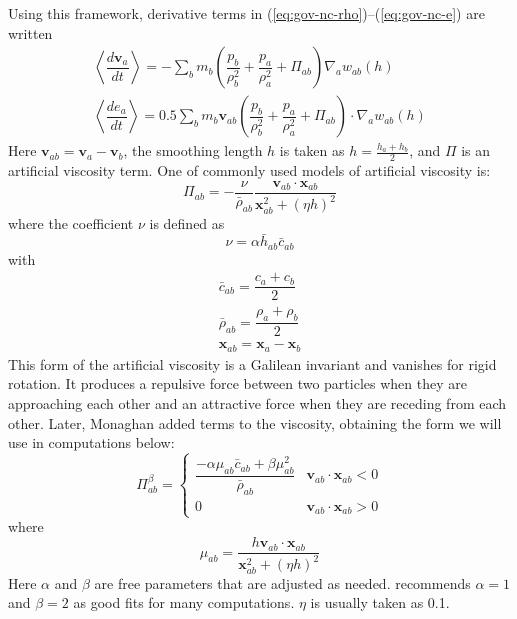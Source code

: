 \documentclass[review]{elsarticle}
\begin{document}
 Using this framework, derivative terms in (\ref{eq:gov-nc-rho})--(\ref{eq:gov-nc-e}) are written 
\begin{align}
\left\langle\dfrac{d \textbf{v}_a}{d t}\right\rangle = -\sum_b m_b \left(\dfrac{p_b}{\rho_b^2} + \dfrac{p_a}{\rho_a^2} + \Pi_{ab}\right) \nabla_a w_{a b}\left(h\right) \label{eq:ns-sph-v} \\
\left\langle\dfrac{d e_a}{d t}\right\rangle=
 0.5\sum_b m_b \textbf{v}_{a b}\left(\dfrac{p_b}{\rho_b^2} + \dfrac{p_a}{\rho_a^2} + \Pi_{ab}\right) \cdot \nabla_a w_{a b}\left(h\right) \label{eq:ns-sph-e}
\end{align}
Here $\textbf{v}_{a b} = \textbf{v}_a - \textbf{v}_b$, the smoothing length $h$ 
is taken as $h=\frac{h_a + h_b}{2}$, and $\Pi$ is an artificial viscosity term.
One of commonly used models of artificial viscosity \citep{monaghan1983shock} is:
\begin{equation}
\Pi_{ab}=- \frac{\nu}{\bar{\rho}_{ab}} \dfrac{ \textbf{v}_{ab} \cdot \textbf{x}_{ab}}{\textbf{x}_{ab}^2 + \left(\eta h\right)^2}
\label{eq:art-vis-original}
\end{equation}
where the coefficient $\nu$ is defined as
\begin{equation}
\nu = \alpha \bar{h}_{ab} \bar{c}_{ab}
\end{equation}
with
\begin{align}
\bar{c}_{ab} = \dfrac{c_a + c_b}{2} \\
\bar{\rho}_{ab} = \dfrac{\rho_a + \rho_b}{2} \\
\textbf{x}_{ab}=\textbf{x}_a-\textbf{x}_b
\end{align}
This form of the artificial viscosity  is a Galilean invariant and vanishes for rigid rotation. It produces a repulsive force between two particles when they are approaching each other and an attractive force when they are receding from each other.
Later,  Monaghan\citep{monaghan1992smoothed} added terms to the viscosity,
obtaining the form we will use in computations below:
\begin{equation}
\Pi_{ab}^{\beta} = 
\begin{cases} 
      \dfrac{- \alpha \mu_{ab} \bar{c}_{ab} + \beta \mu_{ab}^2} {\bar{\rho}_{ab}} & \textbf{v}_{ab} \cdot \textbf{x}_{ab} < 0\\
      0 & \textbf{v}_{ab} \cdot \textbf{x}_{ab} > 0
\end{cases}
\label{eq:art-vis-shock}
\end{equation}
where
\begin{equation}
\mu_{ab} = \dfrac{h \textbf{v}_{ab} \cdot \textbf{x}_{ab}}{\textbf{x}_{ab}^2 + \left(\eta h\right)^2} 
\end{equation}
Here $\alpha$ and $\beta$ are free parameters that are adjusted as needed. 
\citep{monaghan2005smoothed}  recommends $\alpha = 1$ and $\beta = 2$ as
good fits for many computations.
 $\eta$ is usually taken as 0.1.
\end{document}
